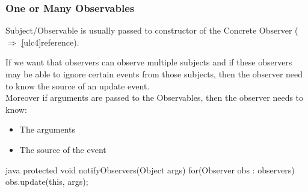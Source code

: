 \subsubsection{One or Many Observables}
\begin{figure}[H]	
  \centering
  \resizebox{\linewidth}{!}{\tikzset{font=\Huge}}
\end{figure}
\begin{sectionbox}[0\ldots 1 : *]\nospacing
  \begin{itemizenosep}
      \item Subject/Observable is usually passed to constructor of the Concrete
    Observer ($\Rightarrow$ \ul[ulc4]{reference}).
      \item 
  \end{itemizenosep}
\end{sectionbox}
\begin{sectionbox}[* : *]\nospacing
  \begin{itemizenosep}
      \item If we want that observers can observe multiple subjects and if these
    observers may be able to ignore certain events from those subjects,
    then the observer need to know the source of an update event.\\
    Moreover if arguments are passed to the Observables, then the observer needs
    to know:
    \begin{itemize}
        \item The arguments
        \item The source of the event
    \end{itemize}
  \end{itemizenosep}
\end{sectionbox}
\begin{figure}[H]	
  \centering
  \resizebox{\linewidth}{!}{\tikzset{font=\Huge}}
\end{figure}
\begin{codeboxNl}{java}
protected void notifyObservers(Object args){
    for(Observer obs : observers){
        obs.update(this, args);
    }
}
\end{codeboxNl}
